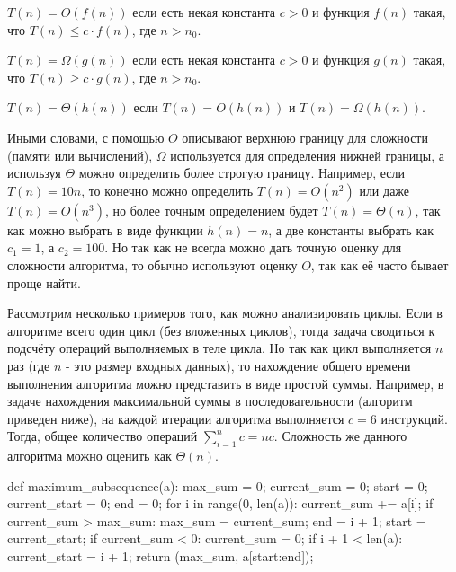 \begin{definition}
$T(n) = O(f(n))$ если есть некая константа $c > 0$ и функция $f(n)$ такая, что $T(n) \le c \cdot f(n)$, где $n>n_0$.
\end{definition}

\begin{definition}
$T(n) = \Omega(g(n))$ если есть некая константа $c > 0$ и функция $g(n)$ такая, что $T(n) \ge c \cdot g(n)$, где $n>n_0$.
\end{definition}

\begin{definition}
$T(n) = \Theta(h(n))$ если $T(n) = O(h(n))$ и $T(n) = \Omega(h(n))$.
\end{definition}

Иными словами, с помощью $O$ описывают верхнюю границу для сложности (памяти или вычислений), $\Omega$ используется для определения нижней границы, а используя $\Theta$ можно определить более строгую 
границу. Например, если $T(n) = 10n$, то конечно можно определить $T(n) = O(n^2)$ или даже $T(n) = O(n^3)$,
но более точным определением будет $T(n) = \Theta(n)$, так как можно выбрать в виде функции $h(n) = n$, а две константы выбрать как $c_1=1$, а $c_2=100$. Но так как не всегда можно дать точную оценку для 
сложности алгоритма, то обычно используют оценку $O$, так как её часто бывает проще найти.

Рассмотрим несколько примеров того, как можно анализировать циклы. Если в алгоритме 
всего один цикл (без вложенных циклов), тогда задача сводиться к подсчёту операций 
выполняемых в теле цикла. Но так как цикл выполняется $n$ раз (где $n$ - это размер входных 
данных), то нахождение общего времени выполнения алгоритма можно представить в виде простой суммы.
Например, в задаче нахождения максимальной суммы в последовательности (алгоритм приведен ниже),
на каждой итерации алгоритма выполняется $c=6$ инструкций. Тогда, общее количество операций 
$\sum_{i=1}^n c = nc$. Сложность же данного алгоритма можно оценить как $\Theta(n)$.

\begin{python}
def maximum_subsequence(a):
	max_sum = 0;
	current_sum = 0;
	start = 0;
	current_start = 0;
	end = 0;
	for i in range(0, len(a)):
		current_sum += a[i];
		if current_sum > max_sum:
			max_sum = current_sum;
			end = i + 1;
			start = current_start;
		if current_sum < 0:
			current_sum = 0;
			if i + 1 < len(a):
				current_start = i + 1;
	return (max_sum, a[start:end]);
\end{python}

